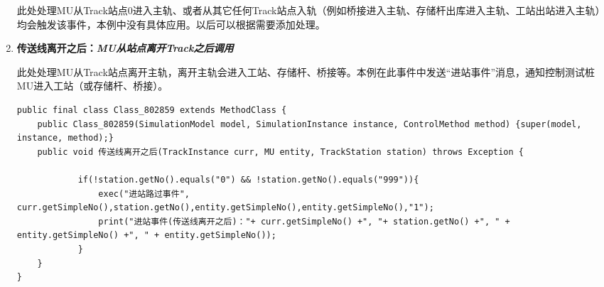 \begin{enumerate}
	此处处理MU从Track站点0进入主轨、或者从其它任何Track站点入轨（例如桥接进入主轨、存储杆出库进入主轨、工站出站进入主轨）均会触发该事件，本例中没有具体应用。以后可以根据需要添加处理。
	\item \bf{传送线离开之后}：\it{MU从站点离开Track之后}调用\par
	此处处理MU从Track站点离开主轨，离开主轨会进入工站、存储杆、桥接等。本例在此事件中发送“进站事件”消息，通知控制测试桩MU进入工站（或存储杆、桥接）。
	\begin{lstlisting}
public final class Class_802859 extends MethodClass {
    public Class_802859(SimulationModel model, SimulationInstance instance, ControlMethod method) {super(model, instance, method);}
    public void 传送线离开之后(TrackInstance curr, MU entity, TrackStation station) throws Exception {
     
            if(!station.getNo().equals("0") && !station.getNo().equals("999")){
                exec("进站路过事件", curr.getSimpleNo(),station.getNo(),entity.getSimpleNo(),entity.getSimpleNo(),"1");
                print("进站事件(传送线离开之后)："+ curr.getSimpleNo() +", "+ station.getNo() +", " + entity.getSimpleNo() +", " + entity.getSimpleNo());
            } 
    }
}
	\end{lstlisting}\vspace{-30pt}
\end{enumerate}

